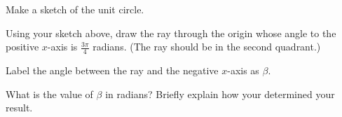 
\begin{problem}
\item Make a sketch of the unit circle. 
  \vfill
  \vfill
  \vfill
\item Using your sketch above, draw the ray through the origin whose
  angle to the positive $x$-axis is $\frac{3\pi}{4}$ radians. (The ray
  should be in the second quadrant.)
\item Label the angle between the ray and the negative $x$-axis as $\beta$.
\item What is the value of $\beta$ in radians? Briefly explain how
  your determined your result.
  \vfill
\end{problem}


